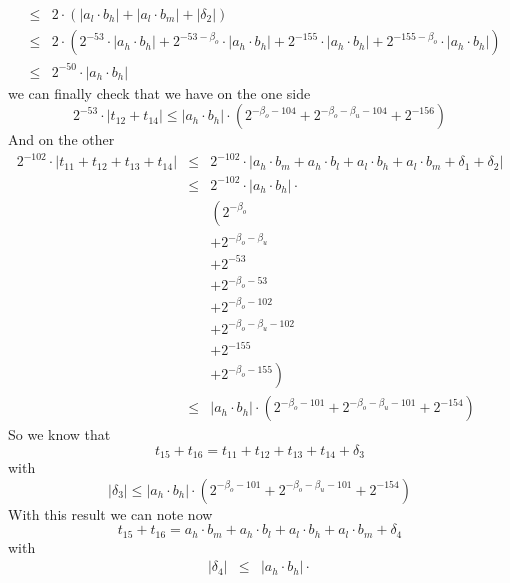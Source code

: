 \documentclass[a4paper,10pt,twoside]{article}
\newenvironment{proof}[1][Proof]{\begin{trivlist}
\item[\hskip \labelsep {\bfseries #1}]}{\end{trivlist}}
\newcommand{\hi}{\ensuremath{\mathit{h}}}
\newcommand{\mi}{\ensuremath{\mathit{m}}}
\newcommand{\lo}{\ensuremath{\mathit{l}}}
\begin{document}
\begin{proof}
\begin{eqnarray*}
& \leq & 2 \cdot \left( \left \vert a_\lo \cdot b_\hi \right \vert + \left \vert a_\lo \cdot b_\mi \right \vert + \left \vert \delta_2 \right \vert 
\right) \\
& \leq & 2 \cdot \left( 2^{-53} \cdot \left \vert a_\hi \cdot b_\hi \right \vert + 
2^{-53-\beta_o} \cdot \left \vert a_\hi \cdot b_\hi \right \vert +  
2^{-155} \cdot \left \vert a_\hi \cdot b_\hi \right \vert +  
2^{-155-\beta_o} \cdot \left \vert a_\hi \cdot b_\hi \right \vert 
\right) \\
& \leq & 2^{-50} \cdot \left \vert a_\hi \cdot b_\hi \right \vert
\end{eqnarray*}
we can finally check that we have on the one side
$$2^{-53} \cdot \left \vert t_{12} + t_{14} \right \vert \leq \left \vert a_\hi \cdot b_\hi \right \vert \cdot 
\left( 2^{-\beta_o-104} + 2^{-\beta_o-\beta_u-104} + 2^{-156} \right)$$
And on the other
\begin{eqnarray*}
2^{-102} \cdot \left \vert t_{11} + t_{12} + t_{13} + t_{14} \right \vert & \leq & 
2^{-102} \cdot \left \vert a_\hi \cdot b_\mi + a_\hi \cdot b_\lo + a_\lo \cdot b_\hi + a_\lo \cdot b_\mi + \delta_1 + \delta_2 \right \vert \\
& \leq & 2^{-102} \cdot \left \vert a_\hi \cdot b_\hi \right \vert \cdot \\
& & \left( 2^{-\beta_o} \right. \\ & & + 2^{-\beta_o-\beta_u} \\ & & + 2^{-53} \\ & & + 2^{-\beta_o-53} \\ & & + 2^{-\beta_o-102} \\ 
& & + 2^{-\beta_o-\beta_u-102} \\ & & + 2^{-155} \\ & & \left. + 2^{-\beta_o-155} \right) \\
& \leq & \left \vert a_\hi \cdot b_\hi \right \vert \cdot \left(
2^{-\beta_o-101} + 2^{-\beta_o-\beta_u-101} + 2^{-154} \right)
\end{eqnarray*}
So we know that 
$$t_{15} + t_{16} = t_{11} + t_{12} + t_{13} + t_{14} + \delta_3$$
with
$$\left \vert \delta_3 \right \vert \leq \left \vert a_\hi \cdot b_\hi \right \vert \cdot \left(
2^{-\beta_o-101} + 2^{-\beta_o-\beta_u-101} + 2^{-154} \right)$$
With this result we can note now
$$t_{15} + t_{16} = a_\hi \cdot b_\mi + a_\hi \cdot b_\lo + a_\lo \cdot b_\hi + a_\lo \cdot b_\mi + \delta_4$$
with
\begin{eqnarray*}
\left \vert \delta_4 \right \vert & \leq & 
\left \vert a_\hi \cdot b_\hi \right \vert \cdot \\

\end{eqnarray*}
\end{proof}
\end{document}
